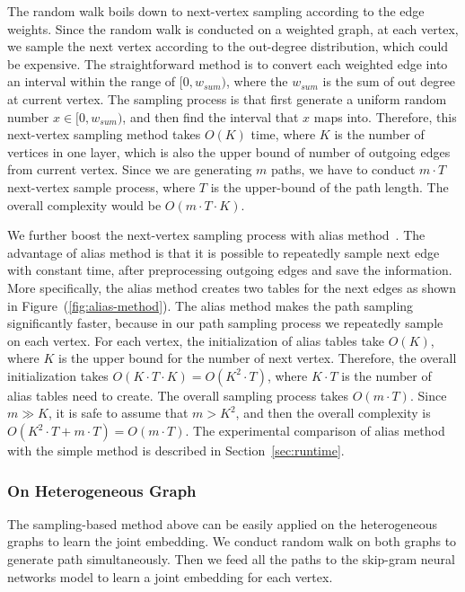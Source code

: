 The random walk boils down to next-vertex sampling according to the edge weights. Since the random walk is conducted on a weighted graph, at each vertex, we sample the next vertex according to the out-degree distribution, which could be expensive. The straightforward method is to convert each weighted edge into an interval within the range of $[0, w_{sum})$, where the $w_{sum}$ is the sum of out degree at current vertex. The sampling process is that first generate a uniform random number $x \in [0, w_{sum})$, and then find the interval that $x$ maps into. Therefore, this next-vertex sampling method takes $O(K)$ time, where $K$ is the number of vertices in one layer, which is also the upper bound of number of outgoing edges from current vertex. Since we are generating $m$ paths, we have to conduct $m \cdot T$ next-vertex sample process, where $T$ is the upper-bound of the path length. The overall complexity would be $O(m\cdot T\cdot K)$.

We further boost the next-vertex sampling process with alias method~\cite{walker1974new}. The advantage of alias method is that it is possible to repeatedly sample next edge with constant time, after preprocessing outgoing edges and save the information.  More specifically, the alias method creates two tables for the next edges as shown in Figure~(\ref{fig:alias-method}).  The alias method makes the path sampling significantly faster, because in  our path sampling process we repeatedly sample on each vertex. For each vertex, the initialization of alias tables take $O(K)$, where $K$ is the upper bound for the number of next vertex. Therefore, the overall initialization takes $O(K \cdot T \cdot K) = O(K^2 \cdot T)$, where $K \cdot T$ is the number of alias tables need to create. The overall sampling process takes $O(m \cdot T)$. Since $m \gg K$, it is safe to assume that $m > K^2$, and then the overall complexity is $O(K^2 \cdot T + m \cdot T) = O(m \cdot T)$. The experimental comparison of alias method with the simple method is described in Section~\ref{sec:runtime}.



\subsubsection{On Heterogeneous Graph}

The sampling-based method above can be easily applied on the heterogeneous graphs to learn the joint embedding. We conduct random walk on both graphs to generate path simultaneously. Then we feed all the paths to the skip-gram neural networks model to learn a joint embedding for each vertex.




